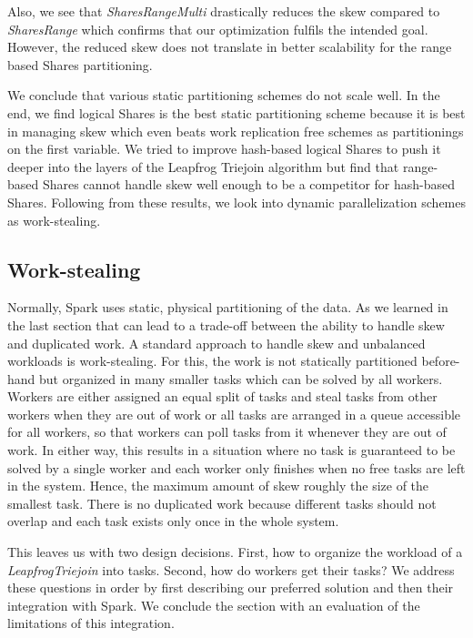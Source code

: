 Also, we see that \textit{SharesRangeMulti} drastically reduces the skew compared to \textit{SharesRange} which confirms that our
optimization fulfils the intended goal.
However, the reduced skew does not translate in better scalability for the range based Shares partitioning.

We conclude that various static partitioning schemes do not scale well.
In the end, we find logical Shares is the best static partitioning scheme because it is best in managing skew which even beats work
replication free schemes as partitionings on the first variable.
We tried to improve hash-based logical Shares to push it deeper into the layers of the Leapfrog Triejoin algorithm but find that
range-based Shares cannot handle skew well enough to be a competitor for hash-based Shares.
Following from these results, we look into dynamic parallelization schemes as work-stealing.

\subsection{Work-stealing} \label{subsec:work-stealing}
Normally, Spark uses static, physical partitioning of the data.
As we learned in the last section that can lead to a trade-off between the ability to handle skew and duplicated work.
A standard approach to handle skew and unbalanced workloads is work-stealing.
For this, the work is not statically partitioned before-hand but organized in many smaller tasks which can be
solved by all workers.
Workers are either assigned an equal split of tasks and steal tasks from other workers when they are out of work or all tasks are arranged
in a queue accessible for all workers, so that workers can poll tasks from it whenever they are out of work.
In either way, this results in a situation where no task is guaranteed to be solved by a single worker and each worker only finishes
when no free tasks are left in the system.
Hence, the maximum amount of skew roughly the size of the smallest task.
There is no duplicated work because different tasks should not overlap and each task exists only once in the whole system.

This leaves us with two design decisions.
First, how to organize the workload of a \textit{LeapfrogTriejoin} into tasks.
Second, how do workers get their tasks?
We address these questions in order by first describing our preferred solution and then their integration with Spark.
We conclude the section with an evaluation of the limitations of this integration.

